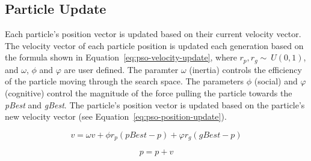 \subsection{Particle Update}
\label{subsec:pso-position}

Each particle's position vector is updated based on their current velocity vector. The velocity vector of each particle position is updated each generation based on the formula shown in Equation~\ref{eq:pso-velocity-update}, where $r_p, r_g \sim\ U(0,1)$, and $\omega$, $\phi$ and $\varphi$ are user defined. The paramter $\omega$ (inertia) controls the efficiency of the particle moving through the search space. The parameters $\phi$ (social) and $\varphi$ (cognitive) control the magnitude of the force pulling the particle towards the \textit{pBest} and \textit{gBest}. The particle's position vector is updated based on the particle's new velocity vector (see Equation~\ref{eq:pso-position-update}).

\begin{equation}
	\label{eq:pso-velocity-update}
	v = \omega{v} + \phi{r_p}(pBest-p) + \varphi{r_g}(gBest-p)
\end{equation}

\begin{equation}
	\label{eq:pso-position-update}
	p = p + v
\end{equation}